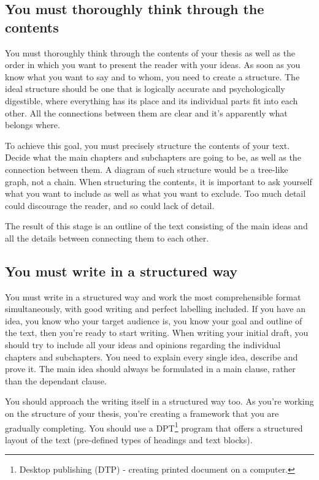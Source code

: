 \subsection*{You must thoroughly think through the contents}
You must thoroughly think through the contents of your thesis as well as the order in which you want to present the reader with your ideas. As soon as you know what you want to say and to whom, you need to create a structure. The ideal structure should be one that is logically accurate and psychologically digestible, where everything has its place and its individual parts fit into each other. All the connections between them are clear and it's apparently what belongs where.

To achieve this goal, you must precisely structure the contents of your text. Decide what the main chapters and subchapters are going to be, as well as the connection between them. A diagram of such structure would be a tree-like graph, not a chain. When structuring the contents, it is important to ask yourself what you want to include as well as what you want to exclude. Too much detail could discourage the reader, and so could lack of detail.

The result of this stage is an outline of the text consisting of the main ideas and all the details between connecting them to each other.

\subsection*{You must write in a structured way}

You must write in a structured way and work the most comprehensible format simultaneously, with good writing and perfect labelling included. If you have an idea, you know who your target audience is, you know your goal and outline of the text, then you're ready to start writing. When writing your initial draft, you should try to include all your ideas and opinions regarding the individual chapters and subchapters. You need to explain every single idea, describe and prove it. The main idea should always be formulated in a main clause, rather than the dependant clause.

You should approach the writing itself in a structured way too. As you're working on the structure of your thesis, you're creating a framework that you are gradually completing. You should use a DPT\footnote{Desktop publishing (DTP) - creating printed document on a computer.} program that offers a structured layout of the text (pre-defined types of headings and text blocks).

